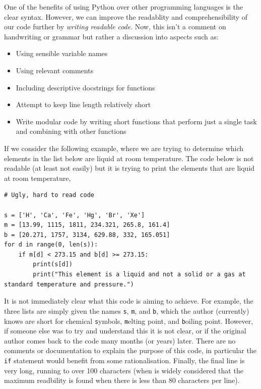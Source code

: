 \documentclass[a4paper]{article}
\begin{document}
One of the benefits of using Python over other programming languages is the clear syntax.
However, we can improve the readablity and comprehensibility of our code further by \emph{writing readable code}.
Now, this isn't a comment on handwriting or grammar but rather a discussion into aspects such as:
\begin{itemize}
  \item{Using sensible variable names}
  \item{Using relevant comments}
  \item{Including descriptive docstrings for functions}
  \item{Attempt to keep line length relatively short}
  \item{Write modular code by writing short functions that perform just a single task and combining with other functions}
\end{itemize}
If we consider the following example, where we are trying to determine which elements in the list below are liquid at room temperature.
The code below is not readable (at least not easily) but it is trying to print the elements that are liquid at room temperature,
\begin{lstlisting}
# Ugly, hard to read code

s = ['H', 'Ca', 'Fe', 'Hg', 'Br', 'Xe']
m = [13.99, 1115, 1811, 234.321, 265.8, 161.4]
b = [20.271, 1757, 3134, 629.88, 332, 165.051]
for d in range(0, len(s)):
    if m[d] < 273.15 and b[d] >= 273.15:
        print(s[d])
        print("This element is a liquid and not a solid or a gas at standard temperature and pressure.")
\end{lstlisting}
It is not immediately clear what this code is aiming to achieve.
For example, the three lists are simply given the names \texttt{s}, \texttt{m}, and \texttt{b}, which the author (currently) knows are short for chemical \texttt{s}ymbols, \texttt{m}elting point, and \texttt{b}oiling point.
However, if someone else was to try and understand this it is not clear, or if the original author comes back to the code many months (or years) later.
There are no comments or documentation to explain the purpose of this code, in particular the \texttt{if} statement would benefit from some rationalisation.
Finally, the final line is very long, running to over 100 characters (when is widely considered that the maximum readbility is found when there is less than 80 characters per line).

\vspace{\baselineskip}
\begin{center}
	\noindent{}
\end{center}
\end{document}
